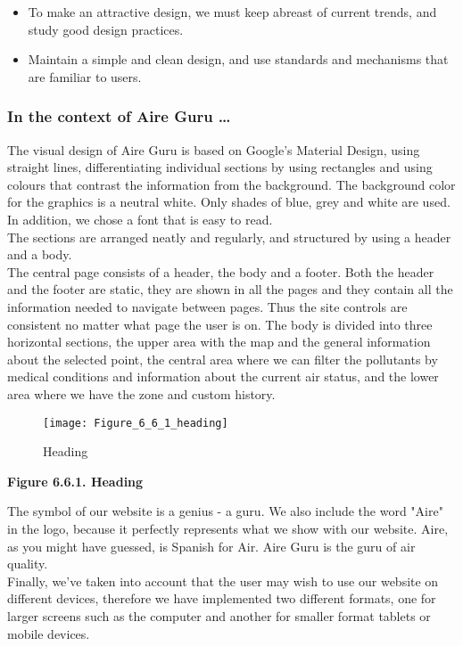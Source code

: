 \begin{itemize}
    \item To make an attractive design, we must keep abreast of current trends, and study good design practices.
    \item Maintain a simple and clean design, and use standards and mechanisms that are familiar to users.
\end{itemize}

\subsubsection*{In the context of Aire Guru \ldots}

The visual design of Aire Guru is based on Google's Material Design, using straight lines, differentiating individual sections by using rectangles
and using colours that contrast the information from the background.
The background color for the graphics is a neutral white.
Only shades of blue, grey and white are used. In addition, we chose a font that is easy to read.\\

The sections are arranged neatly and regularly, and structured by using a header and a body.\\

The central page consists of a header, the body and a footer. Both the header and the footer are static,
they are shown in all the pages and they contain all the information needed to navigate between pages. Thus the site controls are consistent no matter what page the user is on.
The body is divided into three horizontal sections, the upper area with the map and the general information about the selected point,
the central area where we can filter the pollutants by medical conditions and information about the current air status, and the
lower area where we have the zone and custom history.\\

\begin{figure}[ht]
    \centering
    \texttt{[image: Figure\_6\_6\_1\_heading]}
    \caption{Heading}
\end{figure}

\begin{center}
    \bf{     
    Figure 6.6.1. Heading}
  \end{center} 
 
The symbol of our website is a genius - a guru. We also include the word "Aire" in the logo, because it perfectly represents 
what we show with our website. Aire, as you might have guessed, is Spanish for Air. Aire Guru is the guru of air quality. \\

Finally, we've taken into account that the user may wish to use our website on different devices, therefore we have implemented
two different formats, one for larger screens such as the computer and another for smaller format tablets or mobile devices.